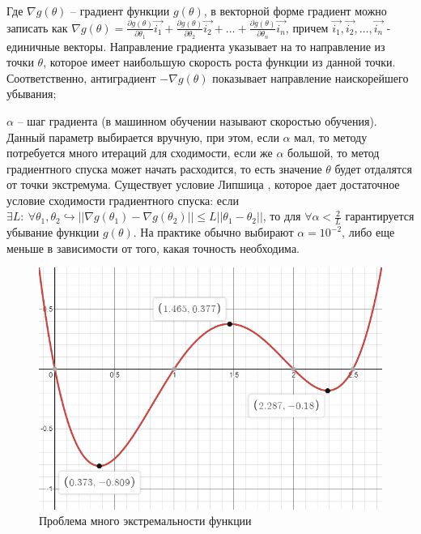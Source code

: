 Где $\nabla g(\theta)$ -- градиент функции $g(\theta)$, в векторной форме градиент можно записать как $\nabla g(\theta) = \frac{\partial g(\theta)}{\partial \theta_1} \vec{i_1} + \frac{\partial g(\theta)}{\partial \theta_2} \vec{i_2} + \dots + \frac{\partial g(\theta)}{\partial \theta_n} \vec{i_n}$, причем $\vec{i_1}, \vec{i_2}, \dots, \vec{i_n}$ - единичные векторы. Направление градиента указывает на то направление из точки $\theta$, которое имеет наибольшую скорость роста функции из данной точки. Соответственно, антиградиент $-\nabla g(\theta)$ показывает направление наискорейшего убывания;

$\alpha$ -- шаг градиента (в машинном обучении называют скоростью обучения). Данный параметр выбирается вручную, при этом, если $\alpha$ мал, то методу потребуется много итераций для сходимости, если же $\alpha$ большой, то метод градиентного спуска может начать расходится, то есть значение $\theta$ будет отдалятся от точки экстремума. Существует условие Липшица \cite{habr:grad_descent}, которое дает достаточное условие сходимости градиентного спуска: если $\exists L:~\forall \theta_1, \theta_2 \hookrightarrow || \nabla g(\theta_1) - \nabla g(\theta_2) || \leq L || \theta_1 - \theta_2 ||$, то для $\forall \alpha < \frac{2}{L}$ гарантируется убывание функции $g(\theta)$. На практике обычно выбирают $\alpha=10^{-2}$, либо еще меньше в зависимости от того, какая точность необходима.

\begin{figure}[H]
    \begin{center}
        \includegraphics[width=0.6\linewidth]{src/img/multi_extreme.png}
        \caption{Проблема много экстремальности функции}
        \label{fig:multi_extreme}
    \end{center}
\end{figure}

